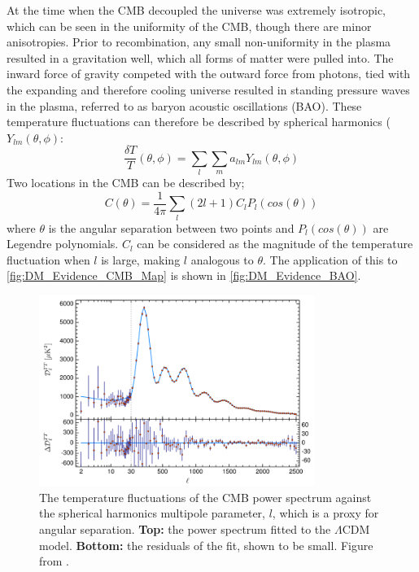 \par
At the time when the CMB decoupled the universe was extremely isotropic, which can be seen in the uniformity of the CMB, though there are minor anisotropies.
Prior to recombination, any small non-uniformity in the plasma resulted in a gravitation well, which all forms of matter were pulled into.
The inward force of gravity competed with the outward force from photons, tied with the expanding and therefore cooling universe resulted in standing pressure waves in the plasma, referred to as baryon acoustic oscillations (BAO).
These temperature fluctuations can therefore be described by spherical harmonics ($Y_{lm}(\theta,\phi)$:
\begin{equation}
    \frac{\delta T}{T}(\theta, \phi) = \sum_{l} \sum_{m} a_{lm}Y_{lm}(\theta,\phi)
    \label{eq:bao_spherical_harmonics}
\end{equation}
Two locations in the CMB can be described by;
\begin{equation}
    C(\theta) = \frac{1}{4\pi} \sum_{l} (2l + 1) C_l P_l (cos(\theta))
\end{equation}
where $\theta$ is the angular separation between two points and $P_l (cos(\theta))$ are Legendre polynomials.
$C_l$ can be considered as the magnitude of the temperature fluctuation when $l$ is large, making $l$ analogous to $\theta$.
The application of this to \autoref{fig:DM_Evidence_CMB_Map} is shown in \autoref{fig:DM_Evidence_BAO}.
\begin{figure}[!htbp]%
    \centering
    \includegraphics[width=0.8\textwidth]{Figures/DarkMatterEvidence/bao.png}
    \caption[Temperature fluctuations of the CMB spectrum as a function of $l$]{The temperature fluctuations of the CMB power spectrum against the spherical harmonics multipole parameter, $l$, which is a proxy for angular separation.
             \textbf{Top:} the power spectrum fitted to the $\Lambda$CDM model.
             \textbf{Bottom:} the residuals of the fit, shown to be small.
             Figure from \cite{plank_result_ref}.}
    \label{fig:DM_Evidence_BAO}
\end{figure}

